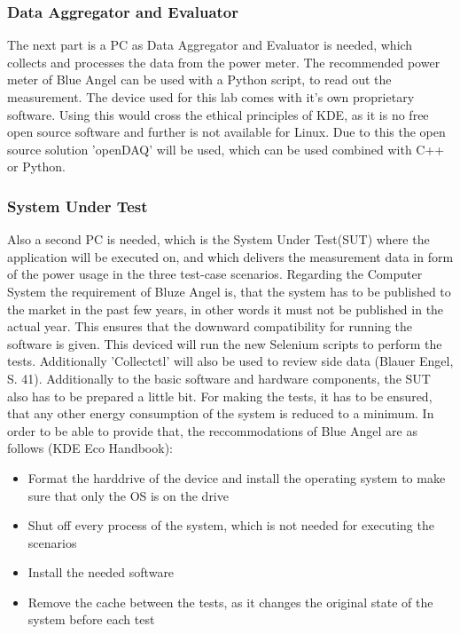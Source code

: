 \documentclass{article}
\begin{document}
        \subsubsection{Data Aggregator and Evaluator}
        The next part is a PC as Data Aggregator and Evaluator is needed, which collects and processes the data from the power meter. The recommended power meter of Blue Angel can be used with a Python script, to read out the measurement. The device used for this lab comes with it's own proprietary software. Using this would cross the ethical principles of KDE, as it is no free open source software and further is not available for Linux. Due to this the open source solution 'openDAQ' will be used, which can be used combined with C++ or Python.
        \subsubsection{System Under Test}
        Also a second PC is needed, which is the System Under Test(SUT) where the application will be executed on, and which delivers the measurement data in form of the power usage in the three test-case scenarios.
        Regarding the Computer System the requirement of Bluze Angel is, that the system has to be published to the market in the past few years, in other words it must not be published in the actual year. This ensures that the downward compatibility for running the software is given. This deviced will run the new Selenium scripts to perform the tests. Additionally 'Collectctl' will also be used to review side data (Blauer Engel, S. 41).
        Additionally to the basic software and hardware components, the SUT also has to be prepared a little bit. For making the tests, it has to be ensured, that any other energy consumption of the system is reduced to a minimum. In order to be able to provide that, the reccommodations of Blue Angel are as follows (KDE Eco Handbook):
        \begin{itemize}
         \item Format the harddrive of the device and install the operating system to make sure that only the OS is on the drive
         \item Shut off every process of the system, which is not needed for executing the scenarios
         \item Install the needed software
         \item Remove the cache between the tests, as it changes the original state of the system before each test
        \end{itemize}
\end{document}
